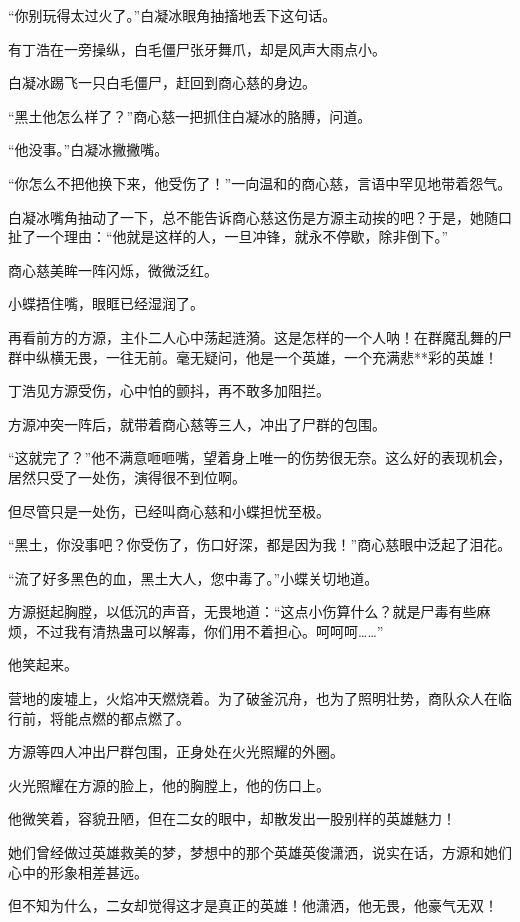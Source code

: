 \begin{this_body}
“你别玩得太过火了。”白凝冰眼角抽搐地丢下这句话。

有丁浩在一旁操纵，白毛僵尸张牙舞爪，却是风声大雨点小。

白凝冰踢飞一只白毛僵尸，赶回到商心慈的身边。

“黑土他怎么样了？”商心慈一把抓住白凝冰的胳膊，问道。

“他没事。”白凝冰撇撇嘴。

“你怎么不把他换下来，他受伤了！”一向温和的商心慈，言语中罕见地带着怨气。

白凝冰嘴角抽动了一下，总不能告诉商心慈这伤是方源主动挨的吧？于是，她随口扯了一个理由：“他就是这样的人，一旦冲锋，就永不停歇，除非倒下。”

商心慈美眸一阵闪烁，微微泛红。

小蝶捂住嘴，眼眶已经湿润了。

再看前方的方源，主仆二人心中荡起涟漪。这是怎样的一个人呐！在群魔乱舞的尸群中纵横无畏，一往无前。毫无疑问，他是一个英雄，一个充满悲**彩的英雄！

丁浩见方源受伤，心中怕的颤抖，再不敢多加阻拦。

方源冲突一阵后，就带着商心慈等三人，冲出了尸群的包围。

“这就完了？”他不满意咂咂嘴，望着身上唯一的伤势很无奈。这么好的表现机会，居然只受了一处伤，演得很不到位啊。

但尽管只是一处伤，已经叫商心慈和小蝶担忧至极。

“黑土，你没事吧？你受伤了，伤口好深，都是因为我！”商心慈眼中泛起了泪花。

“流了好多黑色的血，黑土大人，您中毒了。”小蝶关切地道。

方源挺起胸膛，以低沉的声音，无畏地道：“这点小伤算什么？就是尸毒有些麻烦，不过我有清热蛊可以解毒，你们用不着担心。呵呵呵……”

他笑起来。

营地的废墟上，火焰冲天燃烧着。为了破釜沉舟，也为了照明壮势，商队众人在临行前，将能点燃的都点燃了。

方源等四人冲出尸群包围，正身处在火光照耀的外圈。

火光照耀在方源的脸上，他的胸膛上，他的伤口上。

他微笑着，容貌丑陋，但在二女的眼中，却散发出一股别样的英雄魅力！

她们曾经做过英雄救美的梦，梦想中的那个英雄英俊潇洒，说实在话，方源和她们心中的形象相差甚远。

但不知为什么，二女却觉得这才是真正的英雄！他潇洒，他无畏，他豪气无双！


\end{this_body}
